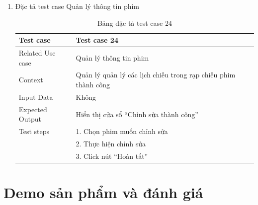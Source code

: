 \documentclass[a4paper, 12pt]{article}
\begin{document}
\begin{enumerate}
	\item Đặc tả test case Quản lý thông tin phim
	\begin{table}[H]
		\centering
		\begin{tabular}{|l|l|} 
		\hline
		\multicolumn{1}{|l|}{Test case} & \multicolumn{1}{l|}{Test case 24}                               \\ 
		\hline
		Related Use case                & Quản lý thông tin phim                                          \\ 
		\hline
		Context                         & Quản lý quản lý các lịch chiếu trong rạp chiếu phim thành công  \\ 
		\hline
		Input Data                      & Không                                                           \\ 
		\hline
		Expected Output                 & Hiển thị cửa sổ “Chỉnh sửa thành công”                          \\ 
		\hline
		Test steps                      & 1. Chọn phim muốn chỉnh sửa                                      \\
										& 2. Thực hiện chỉnh sửa                                           \\
										& 3. Click nút “Hoàn tất”                                          \\
		\hline
		\end{tabular}
		\caption{Bảng đặc tả test case 24}
	\end{table}
\end{enumerate}

\clearpage

\section{Demo sản phẩm và đánh giá}
\label{subsection:demo}
\end{document}
